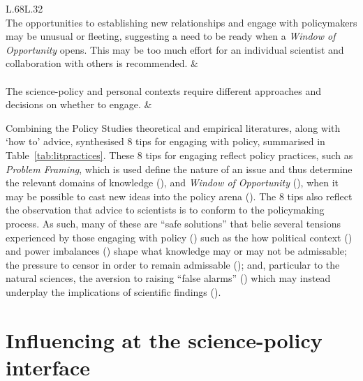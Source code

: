 \begin{table}[!ht]
\begin{tabular}{L{.68\linewidth}L{.32\linewidth}}
 \\
The opportunities to establishing new relationships and engage with policymakers may be unusual or fleeting, suggesting a need to be ready when a \emph{Window of Opportunity} opens. This may be too much effort for an individual scientist and collaboration with others is recommended.	 & 	\textcite{RoseBOP2018} \\ \hline
{} \\
The science-policy and personal contexts require different approaches and decisions on whether to engage. & 	\textcite{OjanenBKP2021,Obermeister2022} \\
\hline
\end{tabular}
\end{table}

Combining the Policy Studies theoretical and empirical literatures, along with `how to' advice, \textcite{OliverC2019} synthesised 8 tips for engaging with policy, summarised in Table~\ref{tab:litpractices}. These 8 tips for engaging reflect policy practices, such as \emph{Problem Framing}, which is used define the nature of an issue and thus determine the relevant domains of knowledge (\cite{OECD2015,MoallemiZHSMZHKHMGLB2023}), and \emph{Window of Opportunity} (\cite{Kingdon1993}), when it may be possible to cast new ideas into the policy arena (\cite{RoseBOP2018}). The 8 tips also reflect the observation that advice to scientists is to conform to the policymaking process. As such, many of these are ``safe solutions'' that belie several tensions experienced by those engaging with policy (\cite{CairneyO2020}) such as the how political context (\cite{SaxonbergSL2023,WesselinkH2020}) and power imbalances (\cite{TurnhoutMWKL2020,OjanenBKP2021,StrassheimK2014}) shape what knowledge may or may not be admissable; the pressure to censor in order to remain admissable (\cite{Pearce2024,OjanenBKP2021}); and, particular to the natural sciences, the aversion to raising ``false alarms'' (\cite{ReadO2017,PoeS2023}) which may instead underplay the implications of \CAN{} scientific findings (\cite{CalverleyA2022}). 

\section{Influencing at the science-policy interface}\label{sec:litinfluencing}

